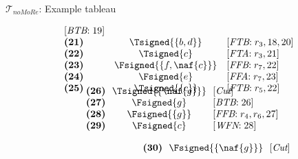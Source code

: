 \begin{frame}{$\mathcal{T}_{\textit{noMoRe}}$: Example tableau}
\begin{center}
\begin{minipage}[t]{16cm}
\begin{minipage}[t]{6cm}
\[\begin{array}{lcl}
  [\textit{BTB}{:}\;\text{19}]                     \\
\textbf{(21)}                                      &
  \Tsigned{\{b,d\}}                                &
  [\textit{FTB}{:}\;r_3, \text{18}, \text{20}]     \\
\textbf{(22)}                                      &
  \Tsigned{c}                                      &
  [\textit{FTA}{:}\;r_3, \text{21}]                \\
\textbf{(23)}                                      &
  \Fsigned{\{f,\naf{c}\}}                   &
  [\textit{FFB}{:}\;r_7, \text{22}]                \\
\textbf{(24)}                                      &
  \Fsigned{e}                                      &
  [\textit{FFA}{:}\;r_7, \text{23}]                \\
\textbf{(25)}                                      &
  \Tsigned{\{c\}}                                  &
  [\textit{FTB}{:}\;r_5, \text{22}]
\vspace{-0.7cm}
\end{array}
\]
\begin{minipage}[t]{1cm}
\[
\hspace{0.25cm}
\begin{array}{l@{~~}c@{~~}l}
\textbf{(26)}                                      &
  \Tsigned{\{\naf{g}\}}                     &
  [\textit{Cut}]                                   \\
\textbf{(27)}                                      &
  \Fsigned{g}                                      &
  [\textit{BTB}{:}\;\text{26}]                     \\
\textbf{(28)}                                      & \hspace{-0.1cm}
  \Fsigned{\{g\}}                                  \hspace{-0.1cm} &
  [\textit{FFB}{:}\;r_4, r_6, \text{27}]           \\
\textbf{(29)}                                      &
  \Fsigned{c}                                      &
  [\textit{WFN}{:}\;\text{28}]
\end{array}
\]
\end{minipage}
\begin{minipage}[t]{2cm}
\[
\hspace{2.75cm}
\begin{array}{l@{~~}c@{~~}l}
\textbf{(30)}                                      &
  \Fsigned{\{\naf{g}\}}                     &
  [\textit{Cut}]                                   \\

\end{array}\]
\end{minipage}
\end{minipage}
\end{minipage}
\end{center}
\end{frame}

